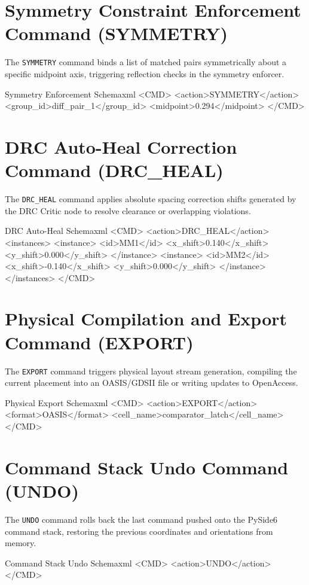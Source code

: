 \section[Symmetry Enforcement (SYMMETRY)]{Symmetry Constraint Enforcement\\Command (SYMMETRY)}
\noindent
The \texttt{SYMMETRY} command binds a list of matched pairs symmetrically about a specific midpoint axis, triggering reflection checks in the symmetry enforcer.
\begin{thesiscode}{Symmetry Enforcement Schema}{xml}
<CMD>
  <action>SYMMETRY</action>
  <group_id>diff_pair_1</group_id>
  <midpoint>0.294</midpoint>
</CMD>
\end{thesiscode}

\section{DRC Auto-Heal Correction Command (DRC\_HEAL)}
\noindent
The \texttt{DRC\_HEAL} command applies absolute spacing correction shifts generated by the DRC Critic node to resolve clearance or overlapping violations.
\begin{thesiscode}{DRC Auto-Heal Schema}{xml}
<CMD>
  <action>DRC_HEAL</action>
  <instances>
    <instance>
      <id>MM1</id>
      <x_shift>0.140</x_shift>
      <y_shift>0.000</y_shift>
    </instance>
    <instance>
      <id>MM2</id>
      <x_shift>-0.140</x_shift>
      <y_shift>0.000</y_shift>
    </instance>
  </instances>
</CMD>
\end{thesiscode}

\section{Physical Compilation and Export Command (EXPORT)}
\noindent
The \texttt{EXPORT} command triggers physical layout stream generation, compiling the current placement into an OASIS/GDSII file or writing updates to OpenAccess.
\begin{thesiscode}{Physical Export Schema}{xml}
<CMD>
  <action>EXPORT</action>
  <format>OASIS</format>
  <cell_name>comparator_latch</cell_name>
</CMD>
\end{thesiscode}

\section{Command Stack Undo Command (UNDO)}
\noindent
The \texttt{UNDO} command rolls back the last command pushed onto the PySide6 command stack, restoring the previous coordinates and orientations from memory.
\begin{thesiscode}{Command Stack Undo Schema}{xml}
<CMD>
  <action>UNDO</action>
</CMD>
\end{thesiscode}
